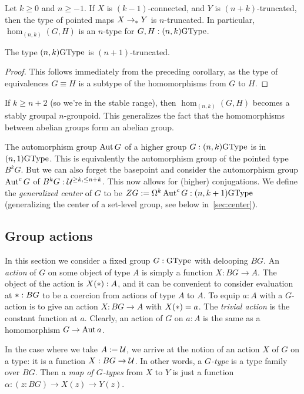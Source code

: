 \begin{cor}
  Let $k\ge0$ and $n\ge-1$. If $X$ is $(k-1)$-connected, and $Y$ is
  $(n+k)$-truncated, then the type of pointed maps $X \to_\ast Y$ is
  $n$-truncated. In particular, $\hom_{(n,k)}(G,H)$ is an $n$-type for
  $G,H:(n,k)\mathrm{GType}$.
\end{cor}
\begin{cor}
  The type $(n,k)\mathrm{GType}$ is $(n+1)$-truncated.
\end{cor}
\begin{proof}
  This follows immediately from the preceding corollary, as the type
  of equivalences $G \equiv H$ is a subtype of the homomorphisms from
  $G$ to $H$.
\end{proof}

If $k\ge n+2$ (so we're in the stable range), then $\hom_{(n,k)}(G,H)$
becomes a stably groupal $n$-groupoid. This generalizes the
fact that the homomorphisms between abelian groups form an abelian
group.

The automorphism group $\operatorname{Aut} G$ of a higher group $G:(n,k)\mathrm{GType}$ is in
$(n,1)\mathrm{GType}$.
This is equivalently the automorphism group of the pointed type $B^kG$.
But we can also forget the basepoint and consider the
automorphism group $\operatorname{Aut}^c G$ of $B^kG:\mathcal{U}^{\ge k,\le n+k}$. This
now allows for (higher) conjugations. We define the \emph{generalized
  center} of $G$ to be $ZG := \Omega^k\operatorname{Aut}^c G : (n,k+1)\mathrm{GType}$
(generalizing the center of a set-level group,
see below in~\cref{sec:center}).

\subsection{Group actions}
\label{sec:actions}

In this section we consider a fixed group $G : \mathrm{GType}$ with delooping
$BG$. An \emph{action} of $G$ on some object of type $A$ is simply
a function $X : BG \to A$. The object of the action is $X(\ast) : A$,
and it can be convenient to consider evaluation at $\ast : BG$ to be a
coercion from actions of type $A$ to $A$. To equip $a : A$ with a
$G$-action is to give an action $X : BG \to A$ with $X(\ast)=a$. The
\emph{trivial action} is the constant function at $a$. Clearly, an
action of $G$ on $a:A$ is the same as a homomorphism $G \to \operatorname{Aut} a$.

In the case where we take $A:=\mathcal{U}$, we arrive at the notion of an action $X$ of $G$ on a type:
it is a function $X:BG\to\mathcal{U}$. 
In other words, a \emph{$G$-type} is a type family over $BG$.
Then a \emph{map of $G$-types} from $X$ to $Y$ is just a function $\alpha :
(z : BG) \to X(z) \to Y(z)$.

